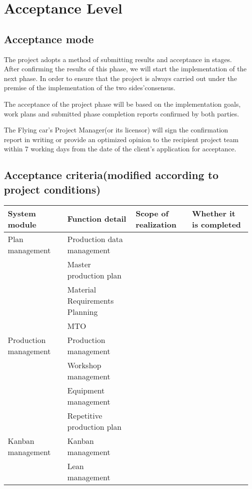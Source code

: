 \chapter{Acceptance Level}

\section{Acceptance mode}

The project adopts a method of submitting results and acceptance in stages. After confirming the results of this phase, we will start the implementation of the next phase. In order to ensure that the project is always carried out under the premise of the implementation of the two sides'consensus.

The acceptance of the project phase will be based on the implementation goals, work plans and submitted phase completion reports confirmed by both parties.

The Flying car's Project Manager(or its licensor) will sign the confirmation report in writing or provide an optimized opinion to the recipient project team within 7 working days from the date of the client's application for acceptance.

\section{ Acceptance criteria(modified according to project conditions)}

\renewcommand\arraystretch{1.5}
\begin{table}[!htb]
\centering
\begin{tabular}[b]{|m{3.5cm}<{\raggedright}|m{3.5cm}<{\raggedright}|m{3.5cm}<{\raggedright}|m{3.5cm}<{\raggedright}|}
\hline
\textbf{System module} &	\textbf{Function detail} &	\textbf{Scope of realization} & \textbf{Whether it is completed} \\
\hline
Plan management & Production data management &  &  \\
\hline
              & Master production plan &  &  \\
\hline		
              & Material Requirements Planning  &  &	\\
\hline	
              & MTO  &   &  \\
\hline		
Production management	& Production management &   &  \\
\hline		
              & Workshop management &   &   \\
\hline		
              & Equipment management &     &    \\
\hline		
              & Repetitive production plan &   &  \\
\hline		
Kanban management & Kanban management	&   &  \\
\hline	
	            & Lean management &  &  \\
\hline		
\end{tabular}
\end{table}



